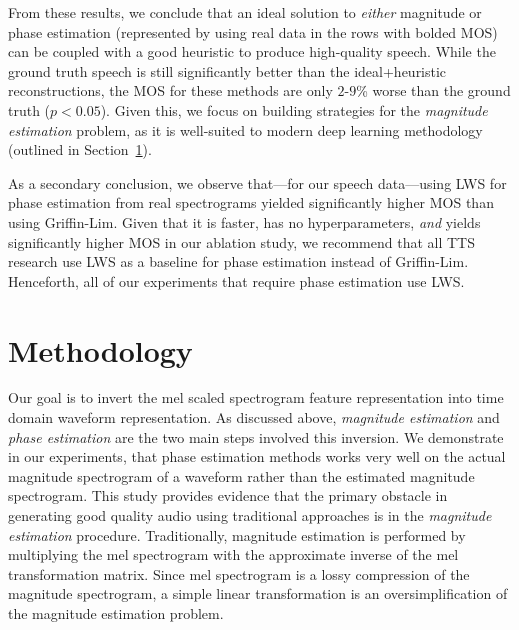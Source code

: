 \documentclass[a4paper]{article}
\begin{document}
From these results, we conclude that an ideal solution to \emph{either} magnitude or phase estimation (represented by using real data in the rows with bolded MOS) can be coupled with a good heuristic to produce high-quality speech. 
While the ground truth speech is still significantly better than the ideal+heuristic reconstructions, 
the MOS for these methods are only $2$-$9$\% worse than the ground truth ($p < 0.05$). 
Given this, we focus on building strategies for the \emph{magnitude estimation} problem, as it is well-suited to modern deep learning methodology (outlined in Section~\ref{sec:methodology}).

As a secondary conclusion, we observe that---for our speech data---using LWS for phase estimation from real spectrograms yielded significantly higher MOS than using Griffin-Lim. 
Given that it is faster, has no hyperparameters, \emph{and} yields significantly higher MOS in our ablation study, we recommend that all TTS research use LWS as a baseline for phase estimation instead of Griffin-Lim. 
Henceforth, all of our experiments that require phase estimation use LWS.


\section{Methodology}
\label{sec:methodology}

Our goal is to invert the mel scaled spectrogram feature representation into time domain waveform representation. As discussed above, \textit{magnitude estimation} and \textit{phase estimation} are the two main steps involved this inversion. We demonstrate in our experiments, that phase estimation methods works very well on the actual magnitude spectrogram of a waveform rather than the estimated magnitude spectrogram. This study provides evidence that the primary obstacle in generating good quality audio using traditional approaches is in the \textit{magnitude estimation} procedure. Traditionally, magnitude estimation is performed by multiplying the mel spectrogram with the approximate inverse of the mel transformation matrix. Since mel spectrogram is a lossy compression of the magnitude spectrogram, a simple linear transformation is an oversimplification of the magnitude estimation problem. 
\end{document}
